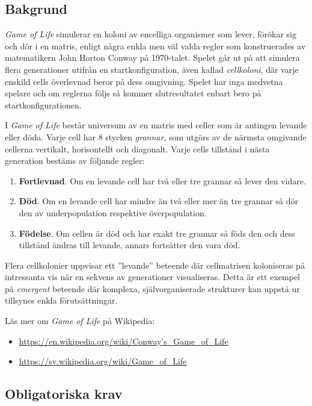 \subsection{Bakgrund}


\emph{Game of Life} simulerar en koloni av encelliga organismer som lever, förökar sig och dör i en matris, enligt några enkla men väl valda regler som konstruerades av matematikern John Horton Conway på 1970-talet. Spelet går ut på att simulera flera generationer utifrån en startkonfiguration, även kallad \emph{cellkoloni}, där varje enskild cells överlevnad beror på dess omgivning. Spelet har inga medvetna spelare och om reglerna följs så kommer slutresultatet enbart bero på startkonfigurationen.



I \emph{Game of Life} består universum av en matris med celler som är antingen levande eller döda. Varje cell har 8 stycken \emph{grannar}, som utgörs av de närmsta omgivande cellerna vertikalt, horisontellt och diagonalt. Varje cells tillstånd i nästa generation bestäms av följande regler:
\begin{enumerate}[nolistsep]
    \item \textbf{Fortlevnad}. Om en levande cell har två eller tre grannar så lever den vidare.
    \item \textbf{Död}. Om en levande cell har mindre än två eller mer än tre grannar så dör den av underpopulation respektive överpopulation.
    \item \textbf{Födelse}. Om cellen är död och har exakt tre grannar så föds den och dess tillstånd ändras till levande, annars fortsätter den vara död.
\end{enumerate}

Flera cellkolonier uppvisar ett ''levande'' beteende där cellmatrisen koloniseras på intressanta vis när en sekvens av generationer visualiseras. Detta är ett exempel på \emph{emergent} beteende där komplexa, självorganiserade strukturer kan uppstå ur tillsynes enkla förutsättningar.

Läs mer om \emph{Game of Life} på Wikipedia:
\begin{itemize}[noitemsep,topsep=0pt]
    	\item \url{https://en.wikipedia.org/wiki/Conway's_Game_of_Life}
    	\item \url{https://sv.wikipedia.org/wiki/Game_of_Life}
\end{itemize}

\subsection{Obligatoriska krav}


